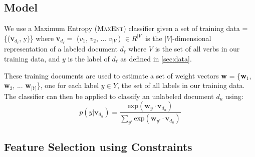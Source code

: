 

\subsection{Model}
We use a Maximum Entropy (\textsc{MaxEnt}) classifier given a set of training data = \{(\textbf{v}$_{d_{\ell}}$, y)\} where \textbf{v}$_{d_{\ell}} =$ ($v_1$, $v_2$, ... $v_{|V|}$) $\in R^{|V|}$ is the $|V|$-dimensional representation of a labeled document $d_{\ell}$ where $V$ is the set of all verbs in our training data, and $y$ is the label of $d_{\ell}$ as defined in \ref{sec:data}.

These training documents are used to estimate a set of weight vectors \textbf{w} = \{\textbf{w}$_1$, \textbf{w}$_2$, ... \textbf{w}$_{|Y|}$\}, one for each label $y \in Y$, the set of all labels in our training data. The classifier can then be applied to classify an unlabeled document $d_{\textit{u}}$ using: 
\scriptsize
 \begin{equation}
	p(y|\textbf{v}_{d_{\textit{u}}}) = \frac{\mathrm{exp}  (\textbf{w}_{y} \cdot \textbf{v}_{d_{\textit{u}}})}{\sum_{y'} \mathrm{exp} (\textbf{w}_{y'} \cdot \textbf{v}_{d_{\textit{u}}})} \label{eqn:maxent}
\end{equation}
\normalsize
\subsection{Feature Selection using Constraints}

